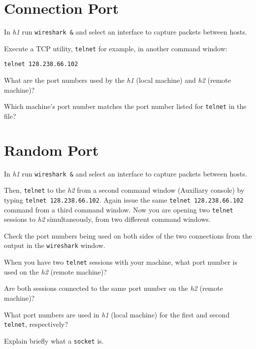 \documentclass{../UTNetLab}
\begin{document}
\section{Connection Port}
    In \textit{h1} run \lstinline{wireshark &} and select an interface to capture packets between hosts.

    Execute a TCP utility, \lstinline{telnet} for example, in another command window:
    \begin{lstlisting}
telnet 128.238.66.102
    \end{lstlisting}
    
    \begin{report}
    \item What are the port numbers used by the \textit{h1} (local machine) and \textit{h2} (remote machine)?

    \item Which machine’s port number matches the port number listed for \lstinline{telnet} in the  file?
    \end{report}

\section{Random Port}
    In \textit{h1} run \lstinline{wireshark &} and select an interface to capture packets between hosts.

    Then, \lstinline{telnet} to the \textit{h2} from a second command window (Auxiliary console) by typing \lstinline{telnet 128.238.66.102}.
    Again issue the same \lstinline{telnet 128.238.66.102} command from a third command window.
    Now you are opening two \lstinline{telnet} sessions to \textit{h2} simultaneously, from two different command windows.

    Check the port numbers being used on both sides of the two connections from the output in the \lstinline{wireshark} window.

    \begin{report}
    \item When you have two \lstinline{telnet} sessions with your machine, what port number is used on the \textit{h2} (remote machine)?

    \item Are both sessions connected to the same port number on the \textit{h2} (remote machine)?

    \item What port numbers are used in \textit{h1} (local machine) for the first and second \lstinline{telnet}, respectively?

    \item Explain briefly what a \lstinline[language=bash]{socket} is.
    \end{report}
\end{document}
